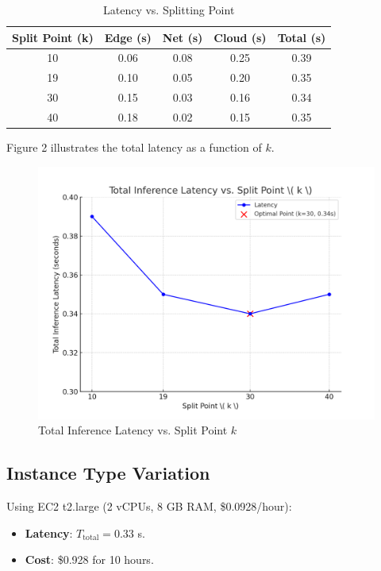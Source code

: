 \documentclass[conference]{IEEEtran}
\begin{document}
\begin{table}[h]
  \caption{Latency vs. Splitting Point}
  \begin{center}
    \begin{tabular}{|c|c|c|c|c|}
      \hline
      \textbf{Split Point (k)} & \textbf{Edge (s)} & \textbf{Net (s)} & \textbf{Cloud (s)} & \textbf{Total (s)} \\
      \hline
      10 & 0.06 & 0.08 & 0.25 & 0.39 \\
      19 & 0.10 & 0.05 & 0.20 & 0.35 \\
      30 & 0.15 & 0.03 & 0.16 & 0.34 \\
      40 & 0.18 & 0.02 & 0.15 & 0.35 \\
      \hline
    \end{tabular}
  \end{center}
  \label{tab:split_latency}
\end{table}

Figure 2 illustrates the total latency as a function of \( k \).

\begin{figure}[h]
  \centering
  \includegraphics[width=0.8\columnwidth]{latency_vs_k.png}
  \caption{Total Inference Latency vs. Split Point \( k \)}
  \label{fig:latency_vs_k}
\end{figure}

\subsection{Instance Type Variation}
Using EC2 t2.large (2 vCPUs, 8 GB RAM, \$0.0928/hour):
\begin{itemize}
  \item \textbf{Latency}: \( T_{\text{total}} = 0.33 \) s.
  \item \textbf{Cost}: \$0.928 for 10 hours.
\end{itemize}
\end{document}
